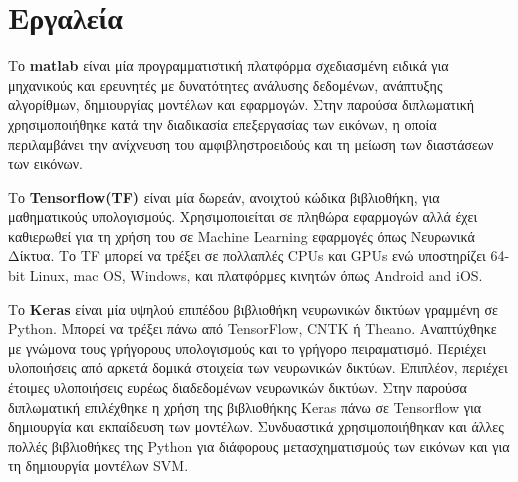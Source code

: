 \section{Εργαλεία}
\label{sec:3.4}
Το \textbf{matlab} είναι μία προγραμματιστική πλατφόρμα σχεδιασμένη ειδικά για μηχανικούς και ερευνητές με δυνατότητες ανάλυσης δεδομένων, ανάπτυξης αλγορίθμων, δημιουργίας μοντέλων και εφαρμογών. Στην παρούσα διπλωματική χρησιμοποιήθηκε κατά την διαδικασία επεξεργασίας των εικόνων, η οποία περιλαμβάνει την ανίχνευση του αμφιβληστροειδούς και τη μείωση των διαστάσεων των εικόνων.

Το \textbf{Tensorflow(TF)} είναι μία δωρεάν, ανοιχτού κώδικα βιβλιοθήκη, για μαθηματικούς υπολογισμούς. Χρησιμοποιείται σε πληθώρα εφαρμογών αλλά έχει καθιερωθεί για τη χρήση του σε Machine Learning εφαρμογές όπως Νευρωνικά Δίκτυα. Το TF μπορεί να τρέξει σε πολλαπλές CPUs και GPUs ενώ υποστηρίζει  64-bit Linux, mac OS, Windows, και πλατφόρμες κινητών όπως Android and iOS.


Το \textbf{Keras} είναι μία υψηλού επιπέδου βιβλιοθήκη νευρωνικών δικτύων γραμμένη σε Python. Μπορεί να τρέξει πάνω από TensorFlow, CNTK ή Theano.  Αναπτύχθηκε με γνώμονα τους γρήγορους υπολογισμούς και το γρήγορο πειραματισμό. Περιέχει υλοποιήσεις από αρκετά δομικά στοιχεία των νευρωνικών δικτύων. Επιπλέον, περιέχει έτοιμες υλοποιήσεις ευρέως διαδεδομένων νευρωνικών δικτύων.  Στην παρούσα διπλωματική επιλέχθηκε η χρήση της βιβλιοθήκης Keras πάνω σε Tensorflow για δημιουργία και εκπαίδευση των μοντέλων. Συνδυαστικά χρησιμοποιήθηκαν και άλλες πολλές βιβλιοθήκες της Python για διάφορους μετασχηματισμούς των εικόνων και για τη δημιουργία μοντέλων SVM.  


